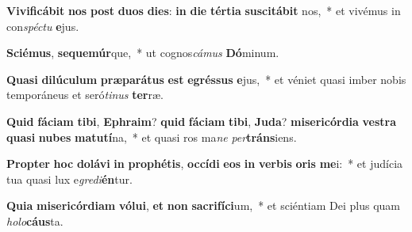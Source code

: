 \item \textbf{Vi}\textbf{vi}\textbf{fi}\textbf{cá}\textbf{bit} \textbf{nos} \textbf{post} \textbf{du}\textbf{os} \textbf{di}\textbf{es}: \textbf{in} \textbf{di}\textbf{e} \textbf{tér}\textbf{ti}\textbf{a} \textbf{su}\textbf{sci}\textbf{tá}\textbf{bit} nos,~* et vivémus in con\textit{spéc}\textit{tu} \textbf{e}jus.
\item \textbf{Sci}\textbf{é}\textbf{mus}, \textbf{se}\textbf{que}\textbf{múr}que,~* ut cognos\textit{cá}\textit{mus} \textbf{Dó}minum.
\item \textbf{Qua}\textbf{si} \textbf{di}\textbf{lú}\textbf{cu}\textbf{lum} \textbf{præ}\textbf{pa}\textbf{rá}\textbf{tus} \textbf{est} \textbf{e}\textbf{grés}\textbf{sus} \textbf{e}jus,~* et véniet quasi imber nobis temporáneus et seró\textit{ti}\textit{nus} \textbf{ter}ræ.
\item \textbf{Quid} \textbf{fá}\textbf{ci}\textbf{am} \textbf{ti}\textbf{bi}, \textbf{E}\textbf{phra}\textbf{im}? \textbf{quid} \textbf{fá}\textbf{ci}\textbf{am} \textbf{ti}\textbf{bi}, \textbf{Ju}\textbf{da}? \textbf{mi}\textbf{se}\textbf{ri}\textbf{cór}\textbf{di}\textbf{a} \textbf{ves}\textbf{tra} \textbf{qua}\textbf{si} \textbf{nu}\textbf{bes} \textbf{ma}\textbf{tu}\textbf{tí}na,~* et quasi ros ma\textit{ne} \textit{per}\textbf{tráns}iens.
\item \textbf{Prop}\textbf{ter} \textbf{hoc} \textbf{do}\textbf{lá}\textbf{vi} \textbf{in} \textbf{pro}\textbf{phé}\textbf{tis}, \textbf{oc}\textbf{cí}\textbf{di} \textbf{e}\textbf{os} \textbf{in} \textbf{ver}\textbf{bis} \textbf{o}\textbf{ris} \textbf{me}i:~* et judícia tua quasi lux e\textit{gre}\textit{di}\textbf{én}tur.
\item \textbf{Qui}\textbf{a} \textbf{mi}\textbf{se}\textbf{ri}\textbf{cór}\textbf{di}\textbf{am} \textbf{vó}\textbf{lu}\textbf{i}, \textbf{et} \textbf{non} \textbf{sa}\textbf{cri}\textbf{fí}\textbf{ci}um,~* et sciéntiam Dei plus quam \textit{ho}\textit{lo}\textbf{cáus}ta.
